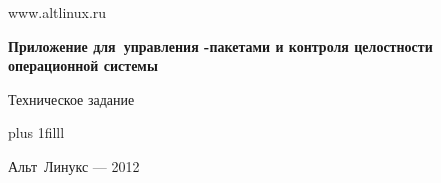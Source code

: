 
\Large
\thispagestyle{empty}
\begin{center}

www.altlinux.ru

\vspace{4cm}

{\LARGE \bf Приложение для~управления -пакетами и контроля целостности\\
операционной системы}

\vspace{1.0cm}

Техническое задание

\end{center}

\vskip 0pt plus 1filll

\begin{center}
Альт~Линукс --- 2012
\end{center}
